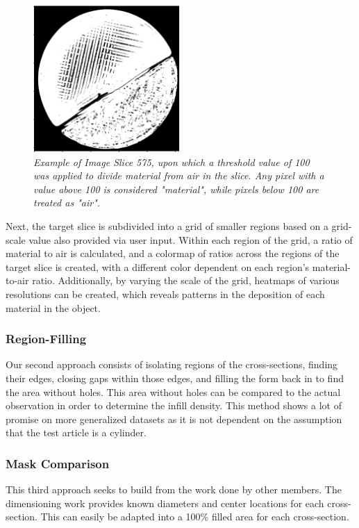 \documentclass[11pt, letterpaper]{article}
\begin{document}
    \begin{figure}[H]
        \centering
        \includegraphics[width=0.5\textwidth]{images/575blackwhite.png}
        \caption{\textit{Example of Image Slice 575, upon which a threshold value of 100 was applied to divide material from air in the slice.  Any pixel with a value above 100 is considered "material", while pixels below 100 are treated as "air".}}
        \label{fig:575blackwhite}
    \end{figure}

    Next, the target slice is subdivided into a grid of smaller regions based on a grid-scale value also provided via user input.  Within each region of the grid, a ratio of material to air is calculated, and a colormap of ratios across the regions of the target slice is created, with a different color dependent on each region's material-to-air ratio.  Additionally, by varying the scale of the grid, heatmaps of various resolutions can be created, which reveals patterns in the deposition of each material in the object.

    \subsubsection{Region-Filling}
    Our second approach consists of isolating regions of the cross-sections, finding their edges, closing gaps within those edges, and filling the form back in to find the area without holes. This area without holes can be compared to the actual observation in order to determine the infill density. This method shows a lot of promise on more generalized datasets as it is not dependent on the assumption that the test article is a cylinder.

    \subsubsection{Mask Comparison}
    This third approach seeks to build from the work done by other members. The dimensioning work provides known diameters and center locations for each cross-section. This can easily be adapted into a 100\% filled area for each cross-section.
\end{document}
